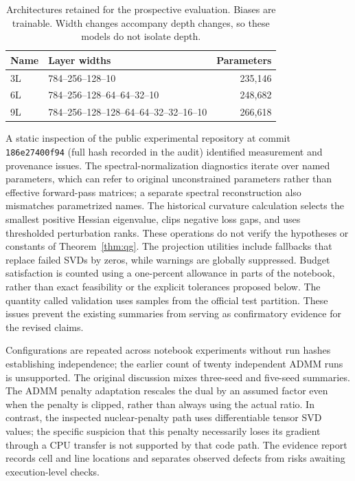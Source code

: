 \begin{table}[htbp]
\centering
\caption{Architectures retained for the prospective evaluation. Biases are trainable. Width changes accompany depth changes, so these models do not isolate depth.}
\label{tab:architectures}
\begin{tabular}{llr}
\toprule
Name & Layer widths & Parameters \\
\midrule
3L & 784--256--128--10 & 235,146\\
6L & 784--256--128--64--64--32--10 & 248,682\\
9L & 784--256--128--128--64--64--32--32--16--10 & 266,618\\
\bottomrule
\end{tabular}
\end{table}

A static inspection of the public experimental repository at commit \texttt{186e27400f94} (full hash recorded in the audit) identified measurement and provenance issues. The spectral-normalization diagnostics iterate over named parameters, which can refer to original unconstrained parameters rather than effective forward-pass matrices; a separate spectral reconstruction also mismatches parametrized names. The historical curvature calculation selects the smallest positive Hessian eigenvalue, clips negative loss gaps, and uses thresholded perturbation ranks. These operations do not verify the hypotheses or constants of Theorem~\ref{thm:qg}. The projection utilities include fallbacks that replace failed SVDs by zeros, while warnings are globally suppressed. Budget satisfaction is counted using a one-percent allowance in parts of the notebook, rather than exact feasibility or the explicit tolerances proposed below. The quantity called validation uses samples from the official test partition. These issues prevent the existing summaries from serving as confirmatory evidence for the revised claims.

Configurations are repeated across notebook experiments without run hashes establishing independence; the earlier count of twenty independent ADMM runs is unsupported. The original discussion mixes three-seed and five-seed summaries. The ADMM penalty adaptation rescales the dual by an assumed factor even when the penalty is clipped, rather than always using the actual ratio. In contrast, the inspected nuclear-penalty path uses differentiable tensor SVD values; the specific suspicion that this penalty necessarily loses its gradient through a CPU transfer is not supported by that code path. The evidence report records cell and line locations and separates observed defects from risks awaiting execution-level checks.

